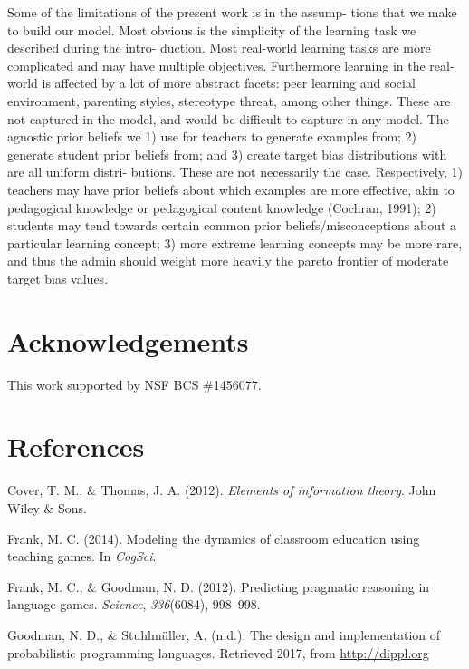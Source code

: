 \documentclass[10pt, letterpaper]{article}
\begin{document}
Some of the limitations of the present work is in the assump- tions that
we make to build our model. Most obvious is the simplicity of the
learning task we described during the intro- duction. Most real-world
learning tasks are more complicated and may have multiple objectives.
Furthermore learning in the real-world is affected by a lot of more
abstract facets: peer learning and social environment, parenting styles,
stereotype threat, among other things. These are not captured in the
model, and would be difficult to capture in any model. The agnostic
prior beliefs we 1) use for teachers to generate examples from; 2)
generate student prior beliefs from; and 3) create target bias
distributions with are all uniform distri- butions. These are not
necessarily the case. Respectively, 1) teachers may have prior beliefs
about which examples are more effective, akin to pedagogical knowledge
or pedagogical content knowledge (Cochran, 1991); 2) students may tend
towards certain common prior beliefs/misconceptions about a particular
learning concept; 3) more extreme learning concepts may be more rare,
and thus the admin should weight more heavily the pareto frontier of
moderate target bias values.

\section{Acknowledgements}\label{acknowledgements}

This work supported by NSF BCS \#1456077.

\section{References}\label{references}

\setlength{\parindent}{-0.1in} \setlength{\leftskip}{0.125in} \noindent

\hypertarget{refs}{}
\hypertarget{ref-cover2012}{}
Cover, T. M., \& Thomas, J. A. (2012). \emph{Elements of information
theory}. John Wiley \& Sons.

\hypertarget{ref-frank2014}{}
Frank, M. C. (2014). Modeling the dynamics of classroom education using
teaching games. In \emph{CogSci}.

\hypertarget{ref-frank2012}{}
Frank, M. C., \& Goodman, N. D. (2012). Predicting pragmatic reasoning
in language games. \emph{Science}, \emph{336}(6084), 998--998.

\hypertarget{ref-goodman2017}{}
Goodman, N. D., \& Stuhlmüller, A. (n.d.). The design and implementation
of probabilistic programming languages. Retrieved 2017, from
\url{http://dippl.org}
\end{document}
